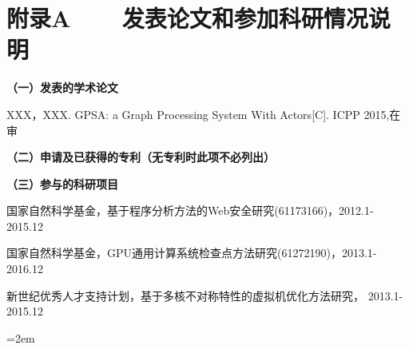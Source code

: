 
\chapter*{附录A~~~~发表论文和参加科研情况说明}
\setlength{\parindent}{0em}
\textbf{（一）发表的学术论文}
\begin{publist}
	\item XXX，XXX. GPSA: a Graph Processing System With Actors[C]. ICPP 2015,在审
\end{publist}

\vspace*{1em}
\textbf{（二）申请及已获得的专利（无专利时此项不必列出）}

\vspace*{1em}
\textbf{（三）参与的科研项目}
\begin{publist}
\item 国家自然科学基金，基于程序分析方法的Web安全研究(61173166)，2012.1-2015.12

\item 国家自然科学基金，GPU通用计算系统检查点方法研究(61272190)，2013.1-2016.12

\item 新世纪优秀人才支持计划，基于多核不对称特性的虚拟机优化方法研究， 2013.1-2015.12
\end{publist}
\vfill
{}\hangindent=2em\noindent

\setlength{\parindent}{2em}
